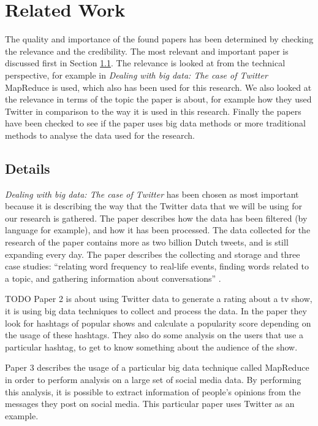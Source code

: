 \section{Related Work}
The quality and importance of the found papers has been determined by checking the relevance and the credibility. The most relevant and important paper is discussed first in Section \ref{subsec:relatedWorkDetails}. The relevance is looked at from the technical perspective, for example in \emph{Dealing with big data: The case of Twitter} \cite{sangDealingWithBigData} MapReduce is used, which also has been used for this research. We also looked at the relevance in terms of the topic the paper is about, for example how they used Twitter in comparison to the way it is used in this research. Finally the papers have been checked to see if the paper uses big data methods or more traditional methods to analyse the data used for the research.

\subsection{Details} \label{subsec:relatedWorkDetails}
\emph{Dealing with big data: The case of Twitter} \cite{sangDealingWithBigData} has been chosen as most important because it is describing the way that the Twitter data that we will be using for our research is gathered. The paper describes how the data has been filtered (by language for example), and how it has been processed. The data collected for the research of the paper contains more as two billion Dutch tweets, and is still expanding every day. The paper describes the collecting and storage and three case studies: ``relating word frequency to real-life events, finding words related to a topic, and gathering information about conversations'' \cite{sangDealingWithBigData}.


TODO
Paper 2 is about using Twitter data to generate a rating about a tv show, it is using big data techniques to collect and process the data. In the paper they look for hashtags of popular shows and calculate a popularity score depending on the usage of these hashtags. They also do some analysis on the users that use a particular hashtag, to get to know something about the audience of the show.

Paper 3 describes the usage of a particular big data technique called MapReduce in order to perform analysis on a large set of social media data. By performing this analysis, it is possible to extract information of people’s opinions from the messages they post on social media. This particular paper uses Twitter as an example.

